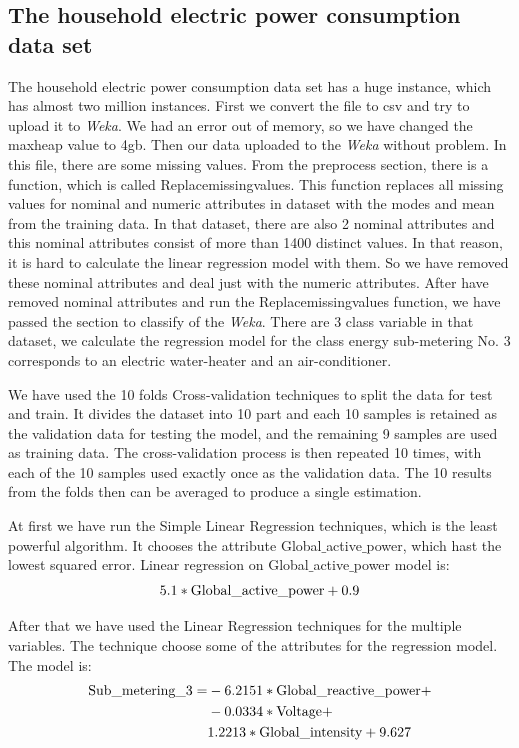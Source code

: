 \documentclass[a4paper]{article}
\begin{document}
\subsection{The household electric power consumption data set}
The household electric power consumption data set has a huge instance, which has almost two million instances. First we convert the file to csv and try to upload it to \emph{Weka}. We had an error out of memory, so we have changed the maxheap value to 4gb. Then our data uploaded to the \emph{Weka} without problem. In this file, there are some missing values. From the preprocess section, there is a function, which is called Replacemissingvalues. This function replaces all missing values for nominal and numeric attributes in dataset with the modes and mean from the training data. In that dataset, there are also 2 nominal attributes and this nominal attributes consist of more than 1400 distinct values. In that reason, it is hard to calculate the linear regression model with them. So we have removed these nominal attributes and deal just with the numeric attributes. After have removed nominal attributes and run the Replacemissingvalues function, we have passed the section to classify of the \emph{Weka}. There are 3 class variable in that dataset, we calculate the regression model for the class energy sub-metering No. 3 corresponds to an electric water-heater and an air-conditioner.

We have used the 10 folds Cross-validation techniques to split the data for test and train. It divides the dataset into 10 part and each 10 samples is retained as the validation data for testing the model, and the remaining 9 samples are used as training data. The cross-validation process is then repeated 10 times, with each of the 10 samples used exactly once as the validation data. The 10 results from the folds then can be averaged to produce a single estimation.  

At first we have run the Simple Linear Regression techniques, which is the least powerful algorithm. It chooses the attribute Global$\_$active$\_$power, which hast the lowest squared error. Linear regression on Global$\_$active$\_$power model is: 
\begin{equation*}
    5.1 * \textnormal{Global\_active\_power} + 0.9
\end{equation*}

After that we have used the Linear Regression techniques for the multiple variables. The technique choose some of the attributes for the regression model. The model is:
\begin{align*}
\textnormal{Sub\_metering\_3} = &-6.2151 * \textnormal{Global\_reactive\_power} +\\
                       &-0.0334 * \textnormal{Voltage} +\\
                       &1.2213 * \textnormal{Global\_intensity} + 9.627 
\end{align*}
\end{document}
